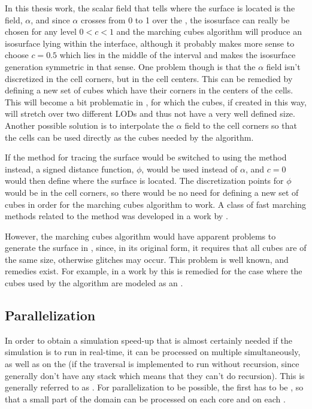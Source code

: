 In this thesis work, the scalar field that tells where the surface is located is the  {field}, $\alpha$, and since $\alpha$ crosses from 0 to 1 over the \interface, the isosurface can really be chosen for any level $0 < c < 1$ and the marching cubes algorithm will produce an isosurface lying within the interface, although it probably makes more sense to choose $c = 0.5$ which lies in the middle of the interval and makes the isosurface generation symmetric in that sense. One problem though is that the $\alpha$ field isn't discretized in the cell corners, but in the cell centers. This can be remedied by defining a new set of cubes which have their corners in the centers of the cells. This will become a bit problematic in , for which the cubes, if created in this way, will stretch over two different LODs and thus not have a very well defined size. Another possible solution is to interpolate the $\alpha$ field to the cell corners so that the cells can be used directly as the cubes needed by the algorithm.

If the \VOF method for tracing the surface would be switched to using the \LS method instead, a signed distance function, $\phi$, would be used instead of $\alpha$, and $c = 0$ would then define where the surface is located. The discretization points for $\phi$ would be in the cell corners, so there would be no need for defining a new set of cubes in order for the marching cubes algorithm to work. A class of fast marching methods related to the \LS method was developed in a work by \citet{Sethian1995}.

However, the marching cubes algorithm would have apparent problems to generate the surface in , since, in its original form, it requires that all cubes are of the same size, otherwise glitches may occur. This problem is well known, and remedies exist. For example, in a work by \citet{Lengyel2010} this is remedied for the case where the cubes used by the algorithm are modeled as an \octree.

\subsection{Parallelization}

In order to obtain a simulation speed-up that is almost certainly needed if the simulation is to run in real-time, it can be processed on multiple \CPUs simultaneously, as well as on the \GPU (if the \octree traversal is implemented to run without recursion, since \GPUs generally don't have any stack which means that they can't do recursion). This is generally referred to as \parallelization. For parallelization to be possible, the  first has to be \partitioned, so that a small part of the domain can be processed on each core and on each .

